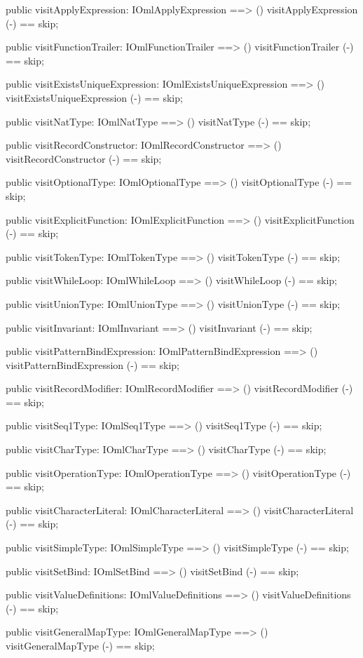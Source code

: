 \begin{vdm_al}
  public visitApplyExpression: IOmlApplyExpression ==> ()
  visitApplyExpression (-) == skip;

  public visitFunctionTrailer: IOmlFunctionTrailer ==> ()
  visitFunctionTrailer (-) == skip;

  public visitExistsUniqueExpression: IOmlExistsUniqueExpression ==> ()
  visitExistsUniqueExpression (-) == skip;

  public visitNatType: IOmlNatType ==> ()
  visitNatType (-) == skip;

  public visitRecordConstructor: IOmlRecordConstructor ==> ()
  visitRecordConstructor (-) == skip;

  public visitOptionalType: IOmlOptionalType ==> ()
  visitOptionalType (-) == skip;

  public visitExplicitFunction: IOmlExplicitFunction ==> ()
  visitExplicitFunction (-) == skip;

  public visitTokenType: IOmlTokenType ==> ()
  visitTokenType (-) == skip;

  public visitWhileLoop: IOmlWhileLoop ==> ()
  visitWhileLoop (-) == skip;

  public visitUnionType: IOmlUnionType ==> ()
  visitUnionType (-) == skip;

  public visitInvariant: IOmlInvariant ==> ()
  visitInvariant (-) == skip;

  public visitPatternBindExpression: IOmlPatternBindExpression ==> ()
  visitPatternBindExpression (-) == skip;

  public visitRecordModifier: IOmlRecordModifier ==> ()
  visitRecordModifier (-) == skip;

  public visitSeq1Type: IOmlSeq1Type ==> ()
  visitSeq1Type (-) == skip;

  public visitCharType: IOmlCharType ==> ()
  visitCharType (-) == skip;

  public visitOperationType: IOmlOperationType ==> ()
  visitOperationType (-) == skip;

  public visitCharacterLiteral: IOmlCharacterLiteral ==> ()
  visitCharacterLiteral (-) == skip;

  public visitSimpleType: IOmlSimpleType ==> ()
  visitSimpleType (-) == skip;

  public visitSetBind: IOmlSetBind ==> ()
  visitSetBind (-) == skip;

  public visitValueDefinitions: IOmlValueDefinitions ==> ()
  visitValueDefinitions (-) == skip;

  public visitGeneralMapType: IOmlGeneralMapType ==> ()
  visitGeneralMapType (-) == skip;


\end{vdm_al}
